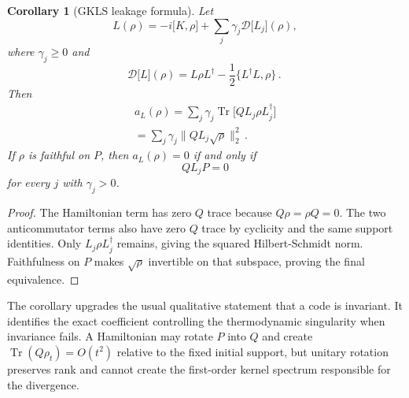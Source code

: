 \documentclass[11pt,a4paper]{article}
\newtheorem{corollary}[theorem]{Corollary}
\theoremstyle{remark}
\begin{document}
\begin{corollary}[GKLS leakage formula]
Let
\[
L(\rho)=-i\bigl[K,\rho\bigr]+\sum_{j} \gamma_j \mathcal{D}\bigl[L_j\bigr](\rho)\mathpunct{,}
\]
where $\gamma_j\ge 0$ and
\[
\mathcal{D}\bigl[L\bigr](\rho)=L \rho L^{\dagger}-\frac{1}{2}\{L^{\dagger} L,\rho\}\mathpunct{.}
\]
Then
\[
\begin{gathered}
a_L(\rho)=\sum_{j} \gamma_j \operatorname{Tr}\bigl[Q L_j \rho L_j^{\dagger}\bigr] \\
=\sum_{j} \gamma_j \lVert Q L_j \sqrt{\rho}\rVert_2^{2}\mathpunct{.}
\end{gathered}
\]
If $\rho$ is faithful on $P$, then $a_L(\rho)=0$ if and only if
\[
Q L_j P=0
\]
for every $j$ with $\gamma_j>0$.
\end{corollary}
\begin{proof}
The Hamiltonian term has zero $Q$ trace because $Q\rho=\rho Q=0$. The two anticommutator terms also have zero $Q$ trace by cyclicity and the same support identities. Only $L_j \rho L_j^{\dagger}$ remains, giving the squared Hilbert-Schmidt norm. Faithfulness on $P$ makes $\sqrt{\rho}$ invertible on that subspace, proving the final equivalence.
\end{proof}
The corollary upgrades the usual qualitative statement that a code is invariant. It identifies the exact coefficient controlling the thermodynamic singularity when invariance fails. A Hamiltonian may rotate $P$ into $Q$ and create $\operatorname{Tr}(Q\rho_t)=O(t^{2})$ relative to the fixed initial support, but unitary rotation preserves rank and cannot create the first-order kernel spectrum responsible for the divergence.
\end{document}

